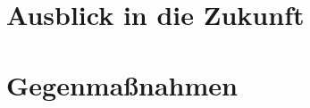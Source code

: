 \documentclass[a4paper,11pt,DIV=11,BROC=5mm,bigheadings,idxtotoc,cleardoubleempty,halfparskip,oneside,openright]{scrreprt} %
\begin{document}
			

			\chapter{Ausblick in die Zukunft}			
			
			\chapter{Gegenmaßnahmen}
	
			
			
			
			
			\newpage
		
	
\end{document}
